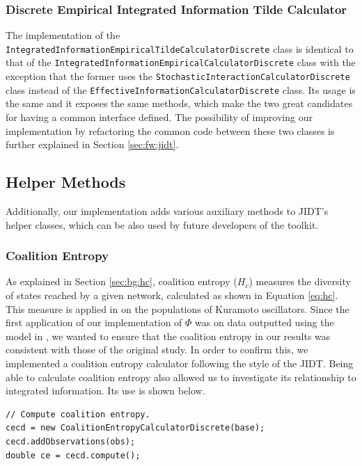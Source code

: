 \documentclass[a4paper,11pt]{article}
\begin{document}
\subsubsection{Discrete Empirical Integrated Information Tilde Calculator}

The implementation of the \texttt{IntegratedInformationEmpiricalTildeCalculatorDiscrete} class is identical to that of the \texttt{IntegratedInformationEmpiricalCalculatorDiscrete} class with the exception that the former uses the \texttt{StochasticInteractionCalculatorDiscrete} class instead of the \texttt{EffectiveInformationCalculatorDiscrete} class. Its usage is the same and it exposes the same methods, which make the two great candidates for having a common interface defined. The possibility of improving our implementation by refactoring the common code between these two classes is further explained in Section \ref{sec:fw:jidt}.

\subsection{Helper Methods}
Additionally, our implementation adds various auxiliary methods to JIDT's helper classes, which can be also used by future developers of the toolkit.

\subsubsection{Coalition Entropy}
\label{sec:impl:hc}

As explained in Section \ref{sec:bg:hc}, coalition entropy ($H_c$) measures the diversity of states reached by a given network, calculated as shown in Equation \ref{eq:hc}. This measure is applied in \cite{Shanahan2010} on the populations of Kuramoto oscillators. Since the first application of our implementation of $\Phi$ was on data outputted using the model in \cite{Shanahan2010}, we wanted to ensure that the coalition entropy in our results was consistent with those of the original study. In order to confirm this, we implemented a coalition entropy calculator following the style of the JIDT. Being able to calculate coalition entropy also allowed us to investigate its relationship to integrated information. Its use is shown below.

\begin{verbatim}
// Compute coalition entropy.
cecd = new CoalitionEntropyCalculatorDiscrete(base);
cecd.addObservations(obs);
double ce = cecd.compute();
\end{verbatim}
\end{document}
